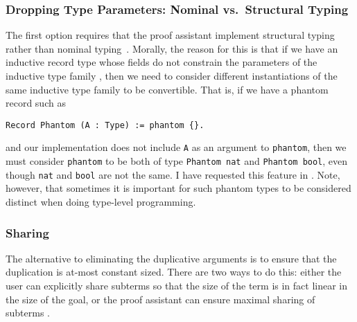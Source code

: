 \subsubsection{Dropping Type Parameters: Nominal vs.~Structural Typing}
The first option requires that the proof assistant implement structural typing~\cite{structural-typing} rather than nominal typing~\cite{nominal-typing}.
Morally, the reason for this is that if we have an inductive record type   whose fields do not constrain the parameters of the inductive type family , then we need to consider different instantiations of the same inductive type family to be convertible.
That is, if we have a phantom record such as
\begin{verbatim}
Record Phantom (A : Type) := phantom {}.
\end{verbatim}
and our implementation does not include \texttt{A} as an argument to \texttt{phantom}, then we must consider \texttt{phantom} to be both of type \texttt{Phantom nat} and \texttt{Phantom bool}, even though \texttt{nat} and \texttt{bool} are not the same.
I have requested this feature in \cite{https://github.com/coq/coq/issues/5293}.
Note, however, that sometimes it is important for such phantom types to be considered distinct when doing type-level programming.

\subsubsection{Sharing}
The alternative to eliminating the duplicative arguments is to ensure that the duplication is at-most constant sized.
There are two ways to do this: either the user can explicitly share subterms so that the size of the term is in fact linear in the size of the goal, or the proof assistant can ensure maximal sharing of subterms .


